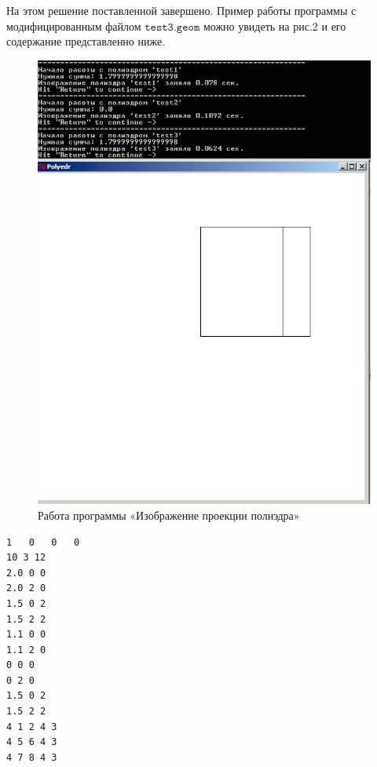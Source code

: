 На этом решение поставленной завершено. Пример работы программы 
с модифицированным файлом $\texttt{test3.geom}$ можно увидеть на рис.2 и его содержание представленно ниже.
\begin{figure}[ht!]
\begin{center}
\includegraphics[width=0.8\hsize]{images/shadow}
\end{center}
\caption{Работа программы «Изображение проекции полиэдра»}
\end{figure}
\newpage\begin{small}
\begin{verbatim}
1	0	0	0
10 3 12
2.0 0 0
2.0 2 0
1.5 0 2
1.5 2 2
1.1 0 0
1.1 2 0
0 0 0
0 2 0
1.5 0 2
1.5 2 2
4 1 2 4 3
4 5 6 4 3
4 7 8 4 3

\end{verbatim}
\end{small}



